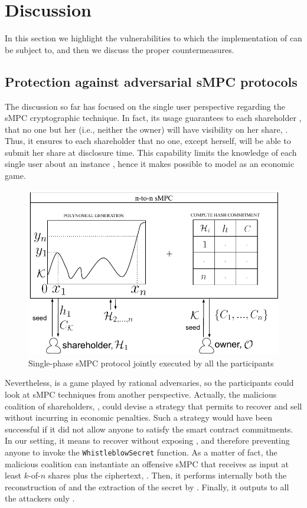 \section{Discussion}\label{sect:impl_attacks}

In this section we highlight the vulnerabilities to which the implementation of \shortname can be subject to, and then we discuss the proper countermeasures.  

\subsection{Protection against adversarial sMPC protocols}\label{sect:impl_mpc}

The discussion so far has focused on the single user perspective regarding the sMPC cryptographic technique.
In fact, its usage guarantees to each shareholder \shareholder, that no one but her (i.e., neither the owner) will have visibility on her share, \share.
Thus, it ensures to each shareholder that no one, except herself, will be able to submit her share at disclosure time. 
This capability limits the knowledge of each single user about an instance \shortname, hence it makes possible to model \shortname as an economic game. 

\begin{figure}[t]
	\centering
	\includegraphics[width=0.9\columnwidth]{fig/mpc_rev_1.pdf}
	\caption{Single-phase sMPC protocol jointly executed by all the participants}
	\label{fig:mpc1}
\end{figure}

Nevertheless, \shortname is a game played by rational adversaries, so the participants could look at sMPC techniques from another perspective.
Actually, the malicious coalition of shareholders, \coalition, could devise a strategy that permits to recover and sell \secret without incurring in economic penalties. 
Such a strategy would have been successful if it did not allow anyone to satisfy the smart contract commitments.
In our setting, it means to recover \secret without exposing \key, and therefore preventing anyone to invoke the \texttt{WhistleblowSecret} function.
As a matter of fact, the malicious coalition can instantiate an offensive sMPC that receives as input at least $k$-of-$n$ shares plus the ciphertext, \ciphertext.
Then, it performs internally both the reconstruction of \key and the extraction of the secret by \unwrap.
Finally, it outputs to all the attackers only \secret. 


